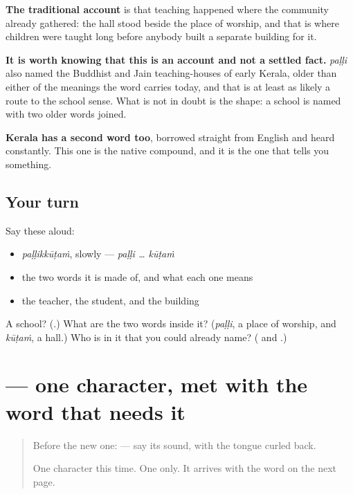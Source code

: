 \begin{culture}
\textbf{The traditional account} is that teaching happened where the community already gathered: the hall stood beside the place of worship, and that is where children were taught long before anybody built a separate building for it.

\textbf{It is worth knowing that this is an account and not a settled fact.} \emph{paḷḷi} also named the Buddhist and Jain teaching-houses of early Kerala, older than either of the meanings the word carries today, and that is at least as likely a route to the school sense. What is not in doubt is the shape: a school is named with two older words joined.

\textbf{Kerala has a second word too}, borrowed straight from English and heard constantly. This one is the native compound, and it is the one that tells you something.
\end{culture}

\subsection*{Your turn}
Say these aloud:

\begin{itemize}
\raggedright
  \item \emph{paḷḷikkūṭaṁ}, slowly — \emph{paḷḷi … kūṭaṁ}
  \item the two words it is made of, and what each one means
  \item the teacher, the student, and the building
\end{itemize}

\begin{tcolorbox}[breakable,colback=teal!4,colframe=teal!35!black,title={Before you move on}]
A school? (\textbf{}.) What are the two words inside it? (\emph{paḷḷi}, a place of worship, and \emph{kūṭaṁ}, a hall.) Who is in it that you could already name? (\textbf{} and \textbf{}.)
\end{tcolorbox}
\section[\texorpdfstring{\ml{ഠ} (ṭha)}{ഠ (ṭha)}]{ — one character, met with the word that needs it}

\label{lesson:ML-S147-letter-ttha}



\begin{quote}
Before the new one: \textbf{} — say its sound, with the tongue curled back.

One character this time. One only. It arrives with the word on the next page.
\end{quote}

